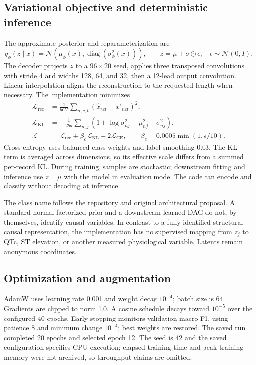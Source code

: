 \documentclass[11pt,a4paper]{article}
\newcommand{\code}[1]{\texttt{\detokenize{#1}}}
\begin{document}
\subsection{Variational objective and deterministic inference}
The approximate posterior and reparameterization are
\begin{equation}
q_\phi(z\mid x)=\mathcal{N}(\mu_\phi(x),\operatorname{diag}(\sigma^2_\phi(x))),\qquad
z=\mu+\sigma\odot\epsilon,\quad\epsilon\sim\mathcal{N}(0,I).
\end{equation}
The decoder projects $z$ to a $96\times20$ seed, applies three transposed convolutions with stride 4 and widths 128, 64, and 32, then a 12-lead output convolution. Linear interpolation aligns the reconstruction to the requested length when necessary. The implementation minimizes
\begin{align}
\mathcal{L}_{\mathrm{rec}}&=\frac{1}{bCT}\sum_{n,c,t}(\hat{x}_{nct}-x'_{nct})^2,\\
\mathcal{L}_{\mathrm{KL}}&=-\frac{1}{2bd}\sum_{n,j}\left(1+\log\sigma^2_{nj}-\mu_{nj}^2-\sigma^2_{nj}\right),\\
\mathcal{L}&=\mathcal{L}_{\mathrm{rec}}+\beta_e\mathcal{L}_{\mathrm{KL}}+2\mathcal{L}_{\mathrm{CE}},
\qquad\beta_e=0.0005\min(1,e/10).
\end{align}
Cross-entropy uses balanced class weights and label smoothing 0.03. The KL term is averaged across dimensions, so its effective scale differs from a summed per-record KL. During training, samples are stochastic; downstream fitting and inference use $z=\mu$ with the model in evaluation mode. The code can encode and classify without decoding at inference.

The class name \code{CausalVAE} follows the repository and original architectural proposal. A standard-normal factorized prior and a downstream learned DAG do not, by themselves, identify causal variables. In contrast to a fully identified structural causal representation, the implementation has no supervised mapping from $z_j$ to QTc, ST elevation, or another measured physiological variable. Latents remain anonymous coordinates.

\subsection{Optimization and augmentation}
AdamW uses learning rate 0.001 and weight decay $10^{-4}$; batch size is 64. Gradients are clipped to norm 1.0. A cosine schedule decays toward $10^{-5}$ over the configured 40 epochs. Early stopping monitors validation macro F1, using patience 8 and minimum change $10^{-4}$; best weights are restored. The saved run completed 20 epochs and selected epoch 12. The seed is 42 and the saved configuration specifies CPU execution; elapsed training time and peak training memory were not archived, so throughput claims are omitted.
\end{document}
